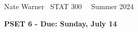 \documentclass{report}
\title{\Huge{}}
\author{\huge{Nathan Warner}}
\date{\huge{}}
\begin{document}
 \pagebreak \bigbreak \noindent
 Nate Warner \ \quad \quad \quad \quad \quad \quad \quad \quad \quad \quad \quad \quad  STAT 300 \quad  \quad \quad \quad \quad \quad \quad \quad \quad \ \ \quad Summer 2024
 \begin{center}
     \textbf{PSET 6 - Due: Sunday, July 14}
 \end{center}
 \bigbreak \noindent 
\end{document}

